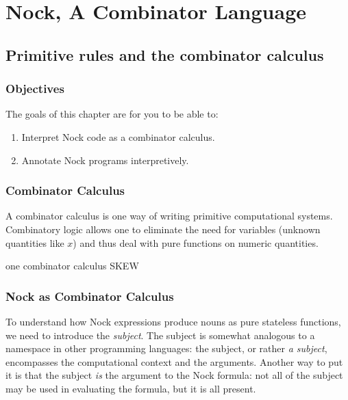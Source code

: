 \setchapterpreamble[u]{\margintoc}
\chapter{Nock, A Combinator Language}


\section{Primitive rules and the combinator calculus}

\subsection{Objectives}

The goals of this chapter are for you to be able to:

\begin{enumerate}
  \item  Interpret Nock code as a combinator calculus.
  \item  Annotate Nock programs interpretively.
\end{enumerate}

\subsection{Combinator Calculus}

A combinator calculus is one way of writing primitive computational systems.  Combinatory logic allows one to eliminate the need for variables (unknown quantities like $x$) and thus deal with pure functions on numeric quantities.

one combinator calculus
SKEW



\subsection{Nock as Combinator Calculus}

To understand how Nock expressions produce nouns as pure stateless functions, we need to introduce the \emph{subject}.  The subject is somewhat analogous to a namespace in other programming languages:  the subject, or rather \emph{a subject}, encompasses the computational context and the arguments.  Another way to put it is that the subject \emph{is} the argument to the Nock formula:  not all of the subject may be used in evaluating the formula, but it is all present.


